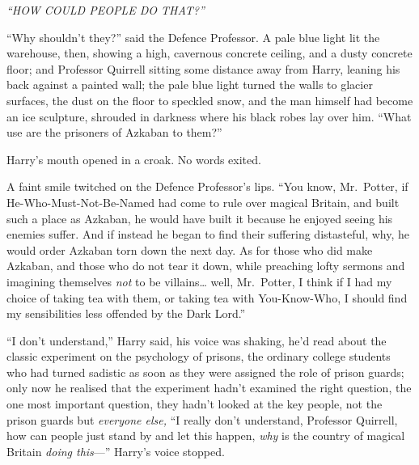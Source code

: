 \emph{``HOW COULD PEOPLE DO THAT?''}

``Why shouldn't they?'' said the Defence Professor. A pale blue light
lit the warehouse, then, showing a high, cavernous concrete ceiling, and
a dusty concrete floor; and Professor Quirrell sitting some distance
away from Harry, leaning his back against a painted wall; the pale blue
light turned the walls to glacier surfaces, the dust on the floor to
speckled snow, and the man himself had become an ice sculpture, shrouded
in darkness where his black robes lay over him. ``What use are the
prisoners of Azkaban to them?''

Harry's mouth opened in a croak. No words exited.

A faint smile twitched on the Defence Professor's lips. ``You know,
Mr.~Potter, if He-Who-Must-Not-Be-Named had come to rule over magical
Britain, and built such a place as Azkaban, he would have built it
because he enjoyed seeing his enemies suffer. And if instead he began to
find their suffering distasteful, why, he would order Azkaban torn down
the next day. As for those who did make Azkaban, and those who do not
tear it down, while preaching lofty sermons and imagining themselves
\emph{not} to be villains\ldots{} well, Mr.~Potter, I think if I had my
choice of taking tea with them, or taking tea with You-Know-Who, I
should find my sensibilities less offended by the Dark Lord.''

``I don't understand,'' Harry said, his voice was shaking, he'd read
about the classic experiment on the psychology of prisons, the ordinary
college students who had turned sadistic as soon as they were assigned
the role of prison guards; only now he realised that the experiment
hadn't examined the right question, the one most important question,
they hadn't looked at the key people, not the prison guards but
\emph{everyone else,} ``I really don't understand, Professor Quirrell,
how can people just stand by and let this happen, \emph{why} is the
country of magical Britain \emph{doing this}---'' Harry's voice stopped.

